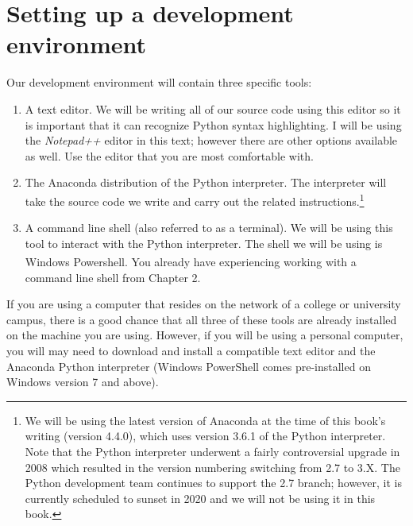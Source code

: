 \documentclass{book}
\begin{document}
\section{Setting up a development environment}
Our development environment will contain three specific tools:
\begin{enumerate}
	\item A text editor. We will be writing all of our source code using this editor so it is important that it can recognize Python syntax highlighting. I will be using the \textit{Notepad++} editor in this text; however there are other options available as well. Use the editor that you are most comfortable with. 
	\item The Anaconda distribution of the Python interpreter. The interpreter will take the source code we write and carry out the related instructions.\footnote{We will be using the latest version of Anaconda at the time of this book's writing (version 4.4.0), which uses version 3.6.1 of the Python interpreter. Note that the Python interpreter underwent a fairly controversial upgrade in 2008 which resulted in the version numbering switching from 2.7 to 3.X. The Python development team continues to support the 2.7 branch; however, it is currently scheduled to sunset in 2020 and we will not be using it in this book.}
	\item A command line shell (also referred to as a terminal). We will be using this tool to interact with the Python interpreter. The shell we will be using is Windows Powershell\textsuperscript{\textregistered}. You already have experiencing working with a command line shell from Chapter 2.
\end{enumerate}

If you are using a computer that resides on the network of a college or university campus, there is a good chance that all three of these tools are already installed on the machine you are using. However, if you will be using a personal computer, you will may need to download and install a compatible text editor and the Anaconda Python interpreter (Windows PowerShell comes pre-installed on Windows version 7 and above).
\end{document}
